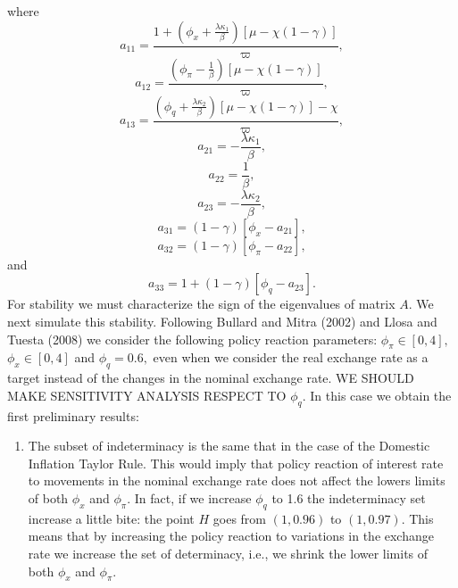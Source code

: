 \documentclass{article}
\begin{document}
where%
\begin{equation*}
a_{11}=\frac{1+\left( \phi _{x}+\frac{\lambda \kappa _{1}}{\beta }\right) %
\left[ \mu -\chi \left( 1-\gamma \right) \right] }{\varpi },
\end{equation*}%
\begin{equation*}
a_{12}=\frac{\left( \phi _{\pi }-\frac{1}{\beta }\right) \left[ \mu -\chi
\left( 1-\gamma \right) \right] }{\varpi },
\end{equation*}%
\begin{equation*}
a_{13}=\frac{\left( \phi _{q}+\frac{\lambda \kappa _{2}}{\beta }\right) %
\left[ \mu -\chi \left( 1-\gamma \right) \right] -\chi }{\varpi },
\end{equation*}%
\begin{equation*}
a_{21}=-\frac{\lambda \kappa _{1}}{\beta },
\end{equation*}%
\begin{equation*}
a_{22}=\frac{1}{\beta },
\end{equation*}%
\begin{equation*}
a_{23}=-\frac{\lambda \kappa _{2}}{\beta },
\end{equation*}%
\begin{equation*}
a_{31}=\left( 1-\gamma \right) \left[ \phi _{x}-a_{21}\right] ,
\end{equation*}%
\begin{equation*}
a_{32}=\left( 1-\gamma \right) \left[ \phi _{\pi }-a_{22}\right] ,
\end{equation*}%
and%
\begin{equation*}
a_{33}=1+\left( 1-\gamma \right) \left[ \phi _{q}-a_{23}\right] .
\end{equation*}%
For stability we must characterize the sign of the eigenvalues of matrix $A.$
We next simulate this stability. Following Bullard and Mitra (2002) and
Llosa and Tuesta (2008) we consider the following policy reaction
parameters: $\phi _{\pi }\in \left[ 0,4\right] ,$ $\phi _{x}\in \left[ 0,4%
\right] $ and $\phi _{q}=0.6,$ even when we consider the real exchange rate
as a target instead of the changes in the nominal exchange rate. WE SHOULD
MAKE SENSITIVITY ANALYSIS RESPECT TO $\phi _{q}.$ In this case we obtain the
first preliminary results:

\begin{enumerate}
\item The subset of indeterminacy is the same that in the case of the
Domestic Inflation Taylor Rule. This would imply that policy reaction of
interest rate to movements in the nominal exchange rate does not affect the
lowers limits of both $\phi _{x}$ and $\phi _{\pi }.$ In fact, if we
increase $\phi _{q}$ to 1.6 the indeterminacy set increase a little bite:
the point $H$ goes from $(1,0.96)$ to $(1,0.97).$ This means that by
increasing the policy reaction to variations in the exchange rate we
increase the set of determinacy, i.e., we shrink the lower limits of both $%
\phi _{x}$ and $\phi _{\pi }.$
\end{enumerate}
\end{document}
